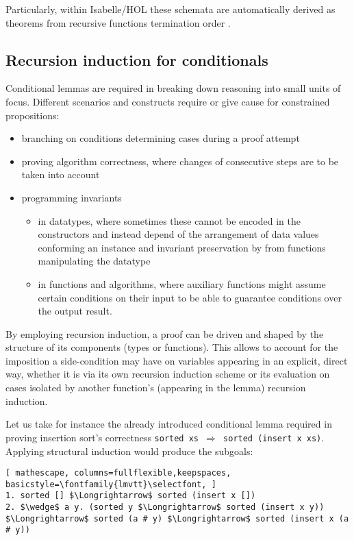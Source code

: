 Particularly, within Isabelle/HOL these schemata are automatically derived as theorems from recursive functions termination order \cite{krauss-term}.
 
 
\subsection{Recursion induction for conditionals}

Conditional lemmas are required in breaking down reasoning into small units of focus.
%
Different scenarios and constructs require or give cause for constrained propositions:

\begin{itemize}
\item branching on conditions determining cases during a proof attempt
\item proving algorithm correctness, where changes of consecutive steps are to be taken into account
\item programming invariants
\begin{itemize}
\item in datatypes, where sometimes these cannot be encoded in the constructors and instead depend of the arrangement of data values conforming an instance and invariant preservation by from functions manipulating the datatype
\item in functions and algorithms, where auxiliary functions might assume certain conditions on their input to be able to guarantee conditions over the output result.
\end{itemize}
\end{itemize}

By employing recursion induction, a proof can be driven and shaped by the structure of its components (types or functions).
%
This allows to account for the imposition a side-condition may have on variables appearing in an explicit, direct way, whether it is via its own recursion induction scheme or its evaluation on cases isolated by another function's (appearing in the lemma) recursion induction.


Let us take for instance the already introduced conditional lemma required in proving insertion sort's correctness \texttt{\selectfont sorted xs $\Longrightarrow$ sorted (insert x xs)}.
%
Applying structural induction would produce the subgoals:

\begin{lstlisting}[ mathescape, columns=fullflexible,keepspaces, basicstyle=\fontfamily{lmvtt}\selectfont, ]
1. sorted [] $\Longrightarrow$ sorted (insert x [])
2. $\wedge$ a y. (sorted y $\Longrightarrow$ sorted (insert x y)) $\Longrightarrow$ sorted (a # y) $\Longrightarrow$ sorted (insert x (a # y))
\end{lstlisting}

